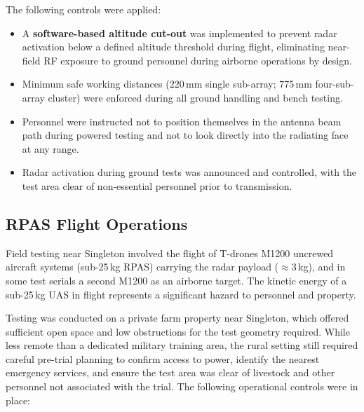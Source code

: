 The following controls were applied:
 
\begin{itemize}
    \item A \textbf{software-based altitude cut-out} was implemented to prevent radar
    activation below a defined altitude threshold during flight, eliminating near-field RF
    exposure to ground personnel during airborne operations by design.
    \item Minimum safe working distances (220\,mm single sub-array; 775\,mm four-sub-array
    cluster) were enforced during all ground handling and bench testing.
    \item Personnel were instructed not to position themselves in the antenna beam path during
    powered testing and not to look directly into the radiating face at any range.
    \item Radar activation during ground tests was announced and controlled, with the test
    area clear of non-essential personnel prior to transmission.
\end{itemize}
 
\subsection*{RPAS Flight Operations}
 
Field testing near Singleton involved the flight of T-drones M1200 uncrewed
aircraft systems (sub-25\,kg RPAS) carrying the radar payload ($\approx$3\,kg), and in some
test serials a second M1200 as an airborne target. The kinetic energy of a sub-25\,kg UAS
in flight represents a significant hazard to personnel and property.
 
Testing was conducted on a private farm property near Singleton, which offered sufficient
open space and low obstructions for the test geometry required. While less remote than a
dedicated military training area, the rural setting still required careful pre-trial planning
to confirm access to power, identify the nearest emergency services, and ensure the test area
was clear of livestock and other personnel not associated with the trial. The following
operational controls were in place:
 
